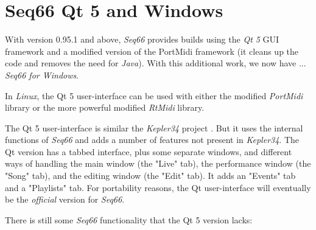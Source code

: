 %
%
%
%

\section{Seq66 Qt 5 and Windows}
\label{sec:qt_portmidi}

   With version 0.95.1 and above,
   \textsl{Seq66} provides builds using
   the \textsl{Qt 5} GUI framework and a modified version of the
   PortMidi framework (it cleans up the code and removes the need for
   \textsl{Java}).
   With this additional work, we now have ...
   \textsl{Seq66 for Windows}.

   In \textsl{Linux}, the Qt 5 user-interface can be used with either the
   modified \textsl{PortMidi} library or the more powerful modified
   \textsl{RtMidi} library.

   The Qt 5 user-interface is similar
   the \textsl{Kepler34} project \cite{kepler34}.
   But it uses the internal functions of \textsl{Seq66} and adds a
   number of features not present in \textsl{Kepler34}.
   The Qt version has a tabbed interface, plus some separate windows,
   and different ways of handling the main
   window (the "Live" tab), the performance window (the "Song" tab), and the
   editing window (the "Edit" tab).
   It adds an "Events" tab and a "Playlists" tab.
   For portability reasons, the Qt user-interface will eventually be the
   \textsl{official} version for \textsl{Seq66}.

   There is still some \textsl{Seq66} functionality that
   the Qt 5 version lacks:

